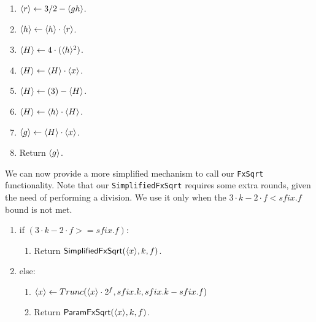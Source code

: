 \begin{enumerate}
\begin{enumerate}
\end{enumerate}
\item $\langle r \rangle \leftarrow 3/2-\langle gh \rangle$.
\item $\langle h \rangle \leftarrow \langle h \rangle \cdot \langle r \rangle$.
\item $\langle H \rangle \leftarrow 4 \cdot (\langle h \rangle^2)$.
\item $\langle H \rangle \leftarrow \langle H \rangle\cdot \langle x \rangle$.
\item $\langle H \rangle \leftarrow (3) - \langle H \rangle$.
\item $\langle H \rangle \leftarrow \langle h \rangle \cdot \langle H \rangle$.
\item $\langle g \rangle \leftarrow \langle H \rangle \cdot \langle x \rangle$.
\item Return $\langle g \rangle$.
\end{enumerate}

We can now provide a more simplified mechanism to call our \verb|FxSqrt| functionality. Note that our \verb|SimplifiedFxSqrt| requires some extra rounds, given the need of performing a division. We use it only when  the $3 \cdot k - 2 \cdot f < sfix.f$ bound is not met. 

\begin{enumerate}
\item if $(3 \cdot k - 2 \cdot f >= sfix.f)$:
\begin{enumerate}
	\item Return $\mathsf{SimplifiedFxSqrt}(\langle x \rangle, k, f)$.
\end{enumerate}
\item else:
\begin{enumerate}
    \item $\langle x \rangle \leftarrow Trunc(\langle x \rangle \cdot 2^{f}, sfix.k, sfix.k-sfix.f)$
	\item Return $\mathsf{ParamFxSqrt}(\langle x \rangle, k, f)$.
\end{enumerate}
\end{enumerate}


